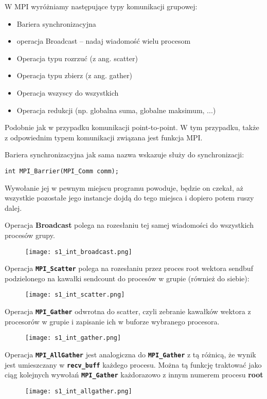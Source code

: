 W MPI wyróżniamy następujące typy komunikacji grupowej: 
\begin{itemize}
\item Bariera synchronizacyjna 
\item operacja Broadcast – nadaj wiadomość wielu procesom 
\item Operacja typu rozrzuć (z ang. scatter) 
\item Operacja typu zbierz (z ang. gather) 
\item Operacja wszyscy do wszystkich 
\item Operacja redukcji (np. globalna suma, globalne maksimum, ...)
\end{itemize}

Podobnie jak w przypadku komunikacji point-to-point. W tym przypadku, także z odpowiednim typem komunikacji związana jest funkcja MPI.

Bariera synchronizacyjna jak sama nazwa wskazuje służy do synchronizacji:

\texttt{int MPI\_Barrier(MPI\_Comm comm);}

Wywołanie jej w pewnym miejscu programu powoduje, będzie on czekał, aż wszystkie pozostałe jego instancje dojdą do tego miejsca i dopiero potem ruszy dalej.

Operacja \textbf{Broadcast} polega na rozesłaniu tej samej wiadomości do wszystkich procesów grupy.
\begin{figure}[H]
\texttt{[image: s1\_int\_broadcast.png]}
\end{figure}

Operacja \texttt{\textbf{MPI\_Scatter}} polega na rozesłaniu przez proces root wektora sendbuf podzielonego na kawałki sendcount do procesów w grupie (również do siebie):
\begin{figure}[H]
\texttt{[image: s1\_int\_scatter.png]}
\end{figure}

Operacja \texttt{\textbf{MPI\_Gather}} odwrotna do scatter, czyli zebranie kawałków wektora z procesorów w grupie i zapisanie ich w buforze wybranego procesora.
\begin{figure}[H]
\texttt{[image: s1\_int\_gather.png]}
\end{figure}

Operacja \texttt{\textbf{MPI\_AllGather}} jest analogiczna do \texttt{\textbf{MPI\_Gather}} z tą różnicą, że wynik jest umieszczany w \texttt{\textbf{recv\_buff}} każdego procesu. Można tą funkcję traktować jako ciąg kolejnych wywołań \texttt{\textbf{MPI\_Gather}} każdorazowo z innym numerem procesu \textbf{root}
\begin{figure}[H]
\texttt{[image: s1\_int\_allgather.png]}
\end{figure}

